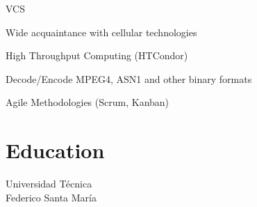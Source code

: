 \documentclass[letterpaper]{cvitae}
\begin{document}
\begin{minipage}[t]{0.35\textwidth}
{VCS}


{Wide acquaintance with cellular technologies}


{High Throughput Computing (HTCondor)}


{Decode/Encode MPEG4, ASN1 and other binary formats}


{Agile Methodologies (Scrum, Kanban)}


\sectionspace

\section{Education}
{Universidad Técnica \\ Federico Santa María}

\end{minipage} %
\end{document}
